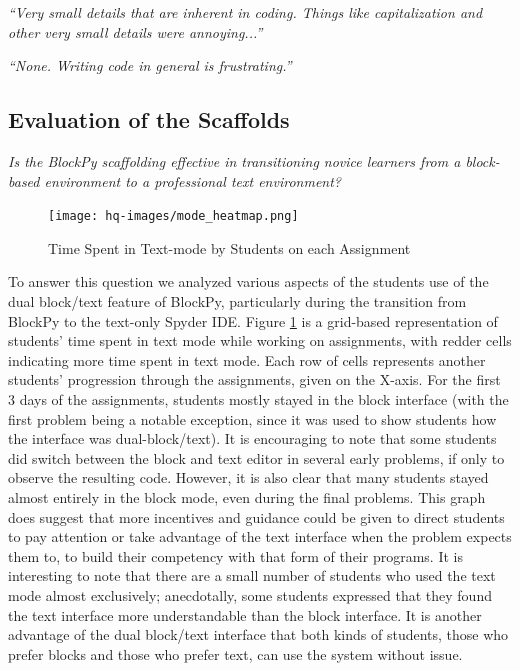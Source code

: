 \documentclass[10pt,journal,compsoc]{IEEEtran}
\begin{document}
\textit{``Very small details that are inherent in coding. Things like capitalization and other very small details were annoying...''}

\textit{``None. Writing code in general is frustrating.''}

\subsection{Evaluation of the Scaffolds}

\textit{Is the BlockPy scaffolding effective in transitioning novice learners from a block-based environment to a professional text environment?}

\begin{figure}[!h]
    \centering
    \vspace{-\medskipamount}
    \texttt{[image: hq-images/mode\_heatmap.png]}
    \vspace{-\bigskipamount}
    \vspace{-\medskipamount}
	\caption{Time Spent in Text-mode by Students on each Assignment}
    \label{fig:time-spent-mode}
    \vspace{-\medskipamount}
\end{figure}

To answer this question we analyzed various aspects of the students use of the dual block/text feature of BlockPy, particularly during the transition from BlockPy to the text-only Spyder IDE.
Figure \ref{fig:time-spent-mode} is a grid-based representation of students' time spent in text mode while working on assignments, with redder cells indicating more time spent in text mode.
Each row of cells represents another students' progression through the assignments, given on the X-axis.
For the first 3 days of the assignments, students mostly stayed in the block interface (with the first problem being a notable exception, since it was used to show students how the interface was dual-block/text).
It is encouraging to note that some students did switch between the block and text editor in several early problems, if only to observe the resulting code.
However, it is also clear that many students stayed almost entirely in the block mode, even during the final problems.
This graph does suggest that more incentives and guidance could be given to direct students to pay attention or take advantage of the text interface when the problem expects them to, to build their competency with that form of their programs.
It is interesting to note that there are a small number of students who used the text mode almost exclusively; anecdotally, some students expressed that they found the text interface more understandable than the block interface.
It is another advantage of the dual block/text interface that both kinds of students, those who prefer blocks and those who prefer text, can use the system without issue.
\end{document}
